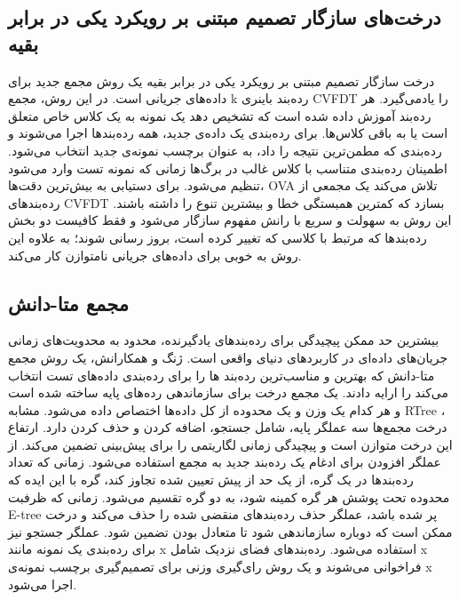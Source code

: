 \subsection{درخت‌های سازگار تصمیم مبتنی بر رویکرد یکی در برابر بقیه }
درخت سازگار تصمیم مبتنی بر رویکرد یکی در برابر بقیه  یک روش مجمع جدید برای داده‌های جریانی است\cite{hashemi2009adapted}. در این روش، مجمع k رده‌بند باینری CVFDT را یادمی‌گیرد. هر رده‌بند آموزش‌ داده شده است که تشخیص دهد یک نمونه به یک کلاس خاص متعلق است یا به باقی کلاس‌ها. برای رده‌بندی یک داده‌ی جدید، همه رده‌بندها اجرا می‌شوند و رده‌بندی که مطمن‌ترین نتیجه را داد، به عنوان برچسب نمونه‌ی جدید انتخاب می‌شود. اطمینان رده‌بندی متناسب با کلاس غالب در برگ‌ها زمانی که نمونه تست وارد می‌شود تنظیم می‌شود. برای دستیابی به بیش‌ترین دقت‌ها، OVA تلاش می‌کند یک مجمعی از رده‌بندهای CVFDT بسازد که کمترین همبستگی‌ خطا و بیشترین تنوع را داشته باشند. این روش به سهولت و سریع با رانش‌ مفهوم سازگار می‌شود و فقط کافیست دو بخش رده‌بندها که مرتبط با کلاسی که تغییر کرده است، بروز رسانی شوند؛ به علاوه این روش به خوبی برای داده‌های جریانی نامتوازن کار می‌کند.


\subsection{مجمع متا-دانش}

بیشترین حد ممکن پیچیدگی برای رده‌بندهای یادگیرنده، محدود به محدویت‌های زمانی جریان‌های داده‌ای در کاربردهای دنیای واقعی است. ژنگ
و همکارانش، یک روش مجمع  متا-دانش
که بهترین و مناسب‌ترین رده‌بند ها را برای رده‌بندی داده‌های تست انتخاب می‌کند را ارایه دادند\cite{zhang2011enabling}.
یک مجمع درخت برای سازماندهی رده‌های پایه ساخته شده است و هر‌ کدام یک وزن و یک محدوده از کل داده‌ها اختصاص داده می‌شود. مشابه RTree ، درخت مجمع‌ها سه عملگر پایه، شامل جستجو، اضافه کردن و حذف کردن دارد. ارتفاع این درخت متوازن است و پیچیدگی زمانی لگاریتمی را برای پیش‌بینی تضمین می‌کند. از عملگر افزودن برای ادغام یک رده‌بند جدید به مجمع استفاده می‌شود. زمانی که تعداد رده‌بندها در یک گره، از یک حد از پیش تعیین شده تجاوز کند، گره با این ایده که محدوده تحت پوشش هر گره کمینه شود،‌ به دو گره تقسیم‌ می‌شود. زمانی که ظرفبت E-tree پر شده باشد، عملگر حذف رده‌بندهای منقضی شده را حذف می‌کند و درخت ممکن است که دوباره سازماندهی شود تا متعادل بودن تضمین شود.
عملگر جستجو نیز برای رده‌بندی یک نمونه مانند x استفاده می‌شود. رده‌بندهای فضای نزدیک شامل x فراخوانی می‌شوند و یک روش رای‌گیری وزنی برای تصمیم‌گیری برچسب نمونه‌ی x اجرا می‌شود.

